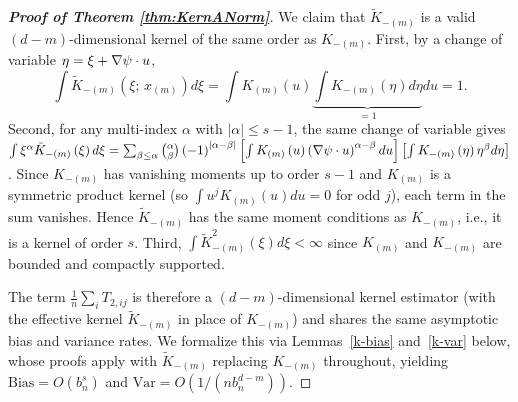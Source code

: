 \documentclass[12pt,american]{article}
\theoremstyle{definition}
\theoremstyle{plain}
\theoremstyle{definition}
\theoremstyle{plain}
\theoremstyle{plain}
\theoremstyle{plain}
\theoremstyle{plain}
\theoremstyle{plain}
\begin{document}
\begin{proof}[\textbf{Proof of Theorem \ref{thm:KernANorm}}]
We claim that $\tilde{K}_{-\left(m\right)}$ is a valid $\left(d-m\right)$-dimensional
kernel of the same order as $K_{-\left(m\right)}$. First, by a change of variable
$\eta=\xi+\nabla\psi\cdot u$,
\[
\int\tilde{K}_{-\left(m\right)}\left(\xi;\,x_{\left(m\right)}\right)d\xi
=\int K_{\left(m\right)}\left(u\right)\underbrace{\int K_{-\left(m\right)}\left(\eta\right)d\eta}_{=1}du=1.
\]
Second, for any multi-index $\alpha$ with $\left|\alpha\right|\leq s-1$,
the same change of variable gives
$\int\xi^{\alpha}\tilde{K}_{-\left(m\right)}\left(\xi\right)d\xi
=\sum_{\beta\leq\alpha}\binom{\alpha}{\beta}\left(-1\right)^{\left|\alpha-\beta\right|}
\left[\int K_{\left(m\right)}\left(u\right)\left(\nabla\psi\cdot u\right)^{\alpha-\beta}du\right]
\left[\int K_{-\left(m\right)}\left(\eta\right)\eta^{\beta}d\eta\right]$.
Since $K_{-\left(m\right)}$ has vanishing moments up to order $s-1$ and
$K_{\left(m\right)}$ is a symmetric product kernel (so $\int u^{j}K_{\left(m\right)}\left(u\right)du=0$
for odd $j$), each term in the sum vanishes. Hence $\tilde{K}_{-\left(m\right)}$
has the same moment conditions as $K_{-\left(m\right)}$, i.e., it is a kernel of order $s$.
Third, $\int\tilde{K}_{-\left(m\right)}^{2}\left(\xi\right)d\xi<\infty$ since $K_{\left(m\right)}$
and $K_{-\left(m\right)}$ are bounded and compactly supported.

The term $\frac{1}{n}\sum_{i}T_{2,ij}$ is therefore a $\left(d-m\right)$-dimensional
kernel estimator (with the effective kernel $\tilde{K}_{-\left(m\right)}$
in place of $K_{-\left(m\right)}$) and shares the same asymptotic bias and variance rates.
We formalize this via Lemmas~\ref{k-bias} and~\ref{k-var} below,
whose proofs apply with $\tilde{K}_{-\left(m\right)}$ replacing $K_{-\left(m\right)}$ throughout,
yielding $\text{Bias}=O\left(b_{n}^{s}\right)$ and
$\text{Var}=O\left(1/\left(nb_{n}^{d-m}\right)\right)$.
\end{proof}
\end{document}
